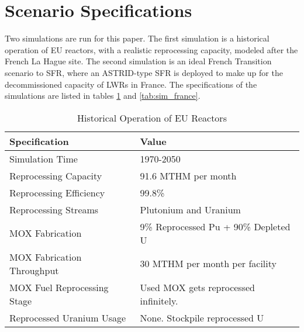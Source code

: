 \section{Scenario Specifications}

Two simulations are run for this paper.
The first simulation is a historical operation of \gls{EU} reactors, with a
realistic reprocessing capacity, modeled after the French La Hague site.
The second simulation is an ideal French Transition scenario to \gls{SFR},
where an ASTRID-type \gls{SFR} is deployed to make up for the decommissioned
capacity of \glspl{LWR} in France. The specifications of the simulations
are listed in tables \ref{tab:sim_eu} and \ref{tab:sim_france}.

\begin{table}[h]
	\centering
	\begin{tabularx}{\textwidth}{bb}
		\hline
		Specification & Value \\
		\hline
		Simulation Time & 1970-2050 \\ 
		Reprocessing Capacity & 91.6 MTHM per month \cite{schneider_spent_2008} \\
		Reprocessing Efficiency & 99.8\% \\
		Reprocessing Streams & Plutonium and Uranium \\
		\gls{MOX} Fabrication & \small{9\% Reprocessed Pu + 90\% Depleted U} \\
		\gls{MOX} Fabrication Throughput & 30 MTHM per month per facility \cite{hugelmann_melox_1999} \\
		\gls{MOX} Fuel Reprocessing Stage &  Used \gls{MOX} gets reprocessed infinitely. \\  
		Reprocessed Uranium Usage &  None. Stockpile reprocessed U \\
		\hline
	\end{tabularx}
	\caption {Historical Operation of \gls{EU} Reactors}
	\label{tab:sim_eu}
\end{table}

